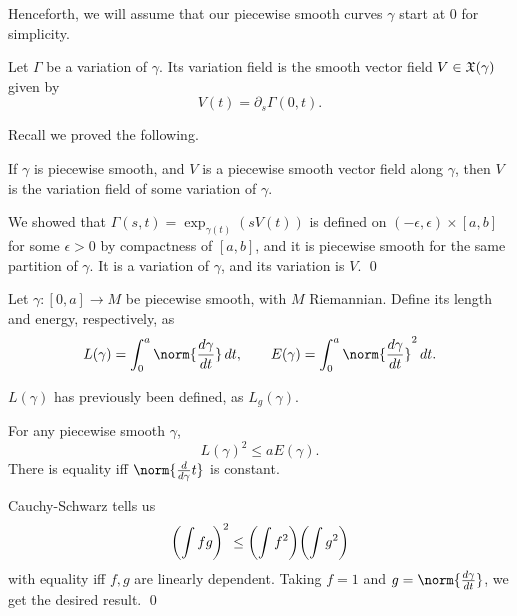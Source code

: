 \edefn

Henceforth, we will assume that our piecewise smooth curves $\gamma$ start at $0$ for simplicity.

\bdefn

    Let $\Gamma$ be a variation of $\gamma$.
    Its {\emphcolor variation field} is the smooth vector field $V\in{\frak X}(\gamma)$ given by
    $$ V(t) = \partial_s\Gamma(0,t) . $$

\edefn

Recall we proved the following.

\blemm

    If $\gamma$ is piecewise smooth, and $V$ is a piecewise smooth vector field along $\gamma$, then $V$ is the variation
    field of some variation of $\gamma$.

\elemm

\bproof

    We showed that $\Gamma(s,t)=\exp_{\gamma(t)}(sV(t))$ is defined on $(-\epsilon,\epsilon)\times[a,b]$ for some $\epsilon>0$
    by compactness of $[a,b]$, and it is piecewise smooth for the same partition of $\gamma$.
    It is a variation of $\gamma$, and its variation is $V$.
    \qed

\eproof

\bdefn

    Let $\gamma\colon[0,a]\to M$ be piecewise smooth, with $M$ Riemannian.
    Define its {\emphcolor length} and {\emphcolor energy}, respectively, as
    $$ L(\gamma) = \int_0^a\norm{\drvof\gamma t}\d t,\qquad E(\gamma) = \int_0^a\norm{\drvof\gamma t}^2\d t . $$

\edefn

\bnote

    $L(\gamma)$ has previously been defined, as $L_g(\gamma)$.

\enote

\blemm

    For any piecewise smooth $\gamma$,
    $$ L(\gamma)^2 \leq aE(\gamma) . $$
    There is equality iff $\norm{\drv\gamma t}$ is constant.

\elemm

\bproof

    Cauchy-Schwarz tells us
    $$ \mathopen{}\mathclose{\left(\int fg\right)}^2 \leq \mathopen{}\mathclose{\left(\int f^2\right)}\mathopen{}\mathclose{\left(\int g^2\right)} $$
    with equality iff $f,g$ are linearly dependent.
    Taking $f=1$ and $g=\norm{\drvof\gamma t}$, we get the desired result.
    \qed

\eproof

\blemm

